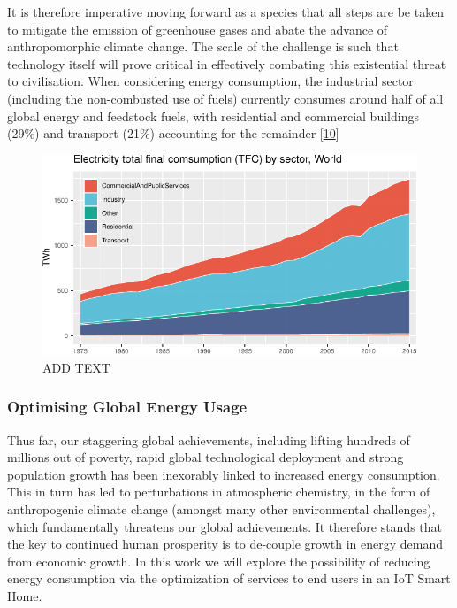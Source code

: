 \documentclass[11pt,]{article}
\begin{document}
It is therefore imperative moving forward as a species that all steps
are be taken to mitigate the emission of greenhouse gases and abate the
advance of anthropomorphic climate change. The scale of the challenge is
such that technology itself will prove critical in effectively combating
this existential threat to civilisation. When considering energy
consumption, the industrial sector (including the non-combusted use of
fuels) currently consumes around half of all global energy and feedstock
fuels, with residential and commercial buildings (29\%) and transport
(21\%) accounting for the remainder
{[}\protect\hyperlink{ref-EnergyDemandSector}{10}{]}

\begin{figure}[H]

{\centering \includegraphics{MD_Final_files/figure-latex/sectorEnergyPlot-1} 

}

\caption{ADD TEXT}\label{fig:sectorEnergyPlot}
\end{figure}

\hypertarget{optimising-global-energy-usage}{%
\subsubsection{Optimising Global Energy
Usage}\label{optimising-global-energy-usage}}

Thus far, our staggering global achievements, including lifting hundreds
of millions out of poverty, rapid global technological deployment and
strong population growth has been inexorably linked to increased energy
consumption. This in turn has led to perturbations in atmospheric
chemistry, in the form of anthropogenic climate change (amongst many
other environmental challenges), which fundamentally threatens our
global achievements. It therefore stands that the key to continued human
prosperity is to de-couple growth in energy demand from economic growth.
In this work we will explore the possibility of reducing energy
consumption via the optimization of services to end users in an IoT
Smart Home.
\end{document}
